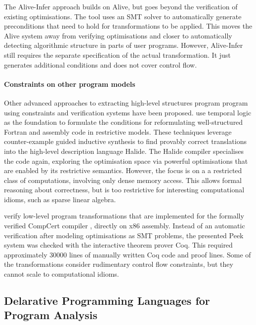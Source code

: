     The Alive-Infer approach \citep{Menendez:2017:ADP:3062341.3062372} builds on
    Alive, but goes beyond the verification of existing optimisations.
    The tool uses an SMT solver to automatically generate preconditions that
    need to hold for transformations to be applied.
    This moves the Alive system away from verifying optimisations and
    closer to automatically detecting algorithmic structure in parts of user
    programs.
    However, Alive-Infer still requires the separate specification of the actual
    transformation.
    It just generates additional conditions and does not cover control flow.

    \paragraph*{Constraints on other program models}
    Other advanced approaches to extracting high-level structures
    program program using constraints and verification systems have been
    proposed.
    \citet{Mendis2015Helium, Kamil2016Verified} use temporal logic as the
    foundation to formulate the conditions for reformulating well-structured
    Fortran and assembly code in restrictive models.
    These techniques leverage counter-example guided inductive synthesis to find
    provably correct translations into the high-level description language
    Halide.
    The Halide compiler specialises the code again, exploring the
    optimisation space via powerful optimisations that are enabled by its
    restrictive semantics.
    However, the focus is on a a restricted class of computations, involving
    only dense memory access.
    This allows formal reasoning about correctness, but is too restrictive for
    interesting computational idioms, such as sparse linear algebra.

    \citet{Mullen:2016:VPO:2908080.2908109} verify low-level program
    transformations that are implemented for the formally verified CompCert
    compiler \citep{CompCert-ERTS-2018}, directly on x86 assembly.
    Instead of an automatic verification after modeling optimisations
    as SMT problems, the presented Peek system was checked with the interactive
    theorem prover Coq.
    This required approximately 30000 lines of manually written Coq code and
    proof lines.
    Some of the transformations consider rudimentary control flow constraints,
    but they cannot scale to computational idioms.

\subsection{Delarative Programming Languages for Program Analysis}

